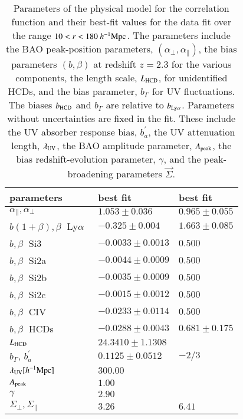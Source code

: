 \documentclass{aa}
\newcommand{\apar}{\alpha_\parallel}
\newcommand{\aperp}{\alpha_\perp}
\newcommand{\hMpc}{h^{-1}{\rm Mpc}}
\newcommand{\Lya}{Ly$\alpha$~}
\newcommand{\blya}{b_{\rm Ly\alpha}}
\newcommand{\bhcds}{b_{\rm HCD}}
\newcommand{\Lhcds}{L_{\rm HCD}}
\newcommand{\Apeak}{A_{\rm peak}}
\newcommand{\lamuv}{\lambda_{\rm UV}}
\begin{document}
\begin{table}
  \centering
  \caption{
    Parameters of the physical model for the correlation function
    and their best-fit values for the data fit over
    the range $10<r<180~\hMpc$.
    The parameters
    include the BAO peak-position parameters, $(\aperp,\apar)$,
    the bias parameters $(b,\beta)$ at redshift $z=2.3$
    for the
    various components, the length scale, $\Lhcds$, for unidentified HCDs,
    and the bias parameter, $b_\Gamma$ for UV fluctuations.
    The biases $\bhcds$ and $b_\Gamma$ are relative to $\blya$.
    Parameters without uncertainties are fixed in the fit.
    These include the UV absorber response bias, $b_a^\prime$, the UV
    attenuation length, $\lambda_{\rm UV}$,
    the BAO amplitude parameter, $\Apeak$, the bias redshift-evolution
    parameter, $\gamma$, and the peak-broadening parameters $\vec{\Sigma}$.
  } 
\label{paramtable}
\begin{tabular}{l l l}
  parameters & best fit & best fit \\
  \hline
 $\apar,\aperp$ &  $  1.053  \pm  0.036 $ &  $ 0.965  \pm  0.055 $   \\ 
 $b(1+\beta),\beta\;$ \Lya &  $  -0.325  \pm  0.004 $ &  $ 1.663  \pm  0.085 $   \\ 
 $b,\beta\;$ Si3 &  $  -0.0033  \pm  0.0013 $ &  $ 0.500   $   \\ 
 $b,\beta\;$ Si2a &  $  -0.0044  \pm  0.0009 $ &  $ 0.500   $   \\ 
 $b,\beta\;$ Si2b &  $  -0.0035  \pm  0.0009 $ &  $ 0.500   $   \\ 
 $b,\beta\;$ Si2c &  $  -0.0015  \pm  0.0012 $ &  $ 0.500   $   \\ 
 $b,\beta\;$ CIV &  $  -0.0233  \pm  0.0114 $ &  $ 0.500   $   \\ 
 $b,\beta\;$ HCDs &  $  -0.0288  \pm  0.0043 $ &  $ 0.681  \pm  0.175 $   \\ 
 $\Lhcds$ &  $  24.3410  \pm  1.1308 $  \\ 
 $b_\Gamma,\,b^\prime_a$  &  $  0.1125  \pm  0.0512 $ & $-2/3$   \\ 
 $\lamuv [\hMpc] $  &  $  300.00   $  \\ 
 $\Apeak$  &  $  1.00   $  \\ 
 $\gamma$  &  $  2.90   $  \\ 
 $\Sigma_\perp,\Sigma_\parallel\;$ &  $  3.26     $ &  $ 6.41   $   \\ 
\end{tabular}
\end{table}
\end{document}
